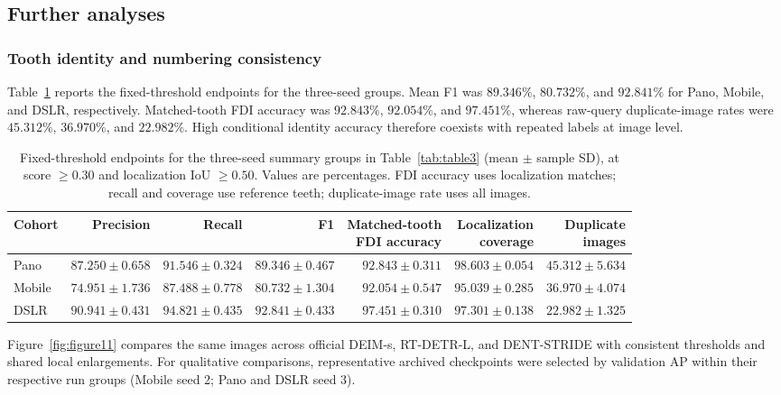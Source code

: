 \documentclass[a4paper,fleqn]{cas-dc}
\begin{document}
\subsection{Further analyses}
\subsubsection{Tooth identity and numbering consistency}
Table~\ref{tab:table7} reports the fixed-threshold endpoints for the three-seed groups. Mean F1 was $89.346\%$, $80.732\%$, and $92.841\%$ for Pano, Mobile, and DSLR, respectively. Matched-tooth FDI accuracy was $92.843\%$, $92.054\%$, and $97.451\%$, whereas raw-query duplicate-image rates were $45.312\%$, $36.970\%$, and $22.982\%$. High conditional identity accuracy therefore coexists with repeated labels at image level.


\begin{table}[pos=t,width=\textwidth]
\caption{Fixed-threshold endpoints for the three-seed summary groups in Table~\ref{tab:table3} (mean $\pm$ sample SD), at score $\geq0.30$ and localization IoU $\geq0.50$. Values are percentages. FDI accuracy uses localization matches; recall and coverage use reference teeth; duplicate-image rate uses all images.}
\label{tab:table7}
\centering
\footnotesize
\setlength{\tabcolsep}{3pt}
\begin{tabular*}{\textwidth}{@{\extracolsep{\fill}}lrrrrrr@{}}
\toprule
Cohort & Precision & Recall & F1 & \shortstack{Matched-tooth\\FDI accuracy} & \shortstack{Localization\\coverage} & \shortstack{Duplicate\\images} \\
\midrule
Pano & $87.250\pm0.658$ & $91.546\pm0.324$ & $89.346\pm0.467$ & $92.843\pm0.311$ & $98.603\pm0.054$ & $45.312\pm5.634$ \\
Mobile & $74.951\pm1.736$ & $87.488\pm0.778$ & $80.732\pm1.304$ & $92.054\pm0.547$ & $95.039\pm0.285$ & $36.970\pm4.074$ \\
DSLR & $90.941\pm0.431$ & $94.821\pm0.435$ & $92.841\pm0.433$ & $97.451\pm0.310$ & $97.301\pm0.138$ & $22.982\pm1.325$ \\
\bottomrule
\end{tabular*}
\end{table}



Figure~\ref{fig:figure11} compares the same images across official DEIM-s, RT-DETR-L, and DENT-STRIDE with consistent thresholds and shared local enlargements. For qualitative comparisons, representative archived checkpoints were selected by validation AP within their respective run groups (Mobile seed 2; Pano and DSLR seed 3).
\end{document}
